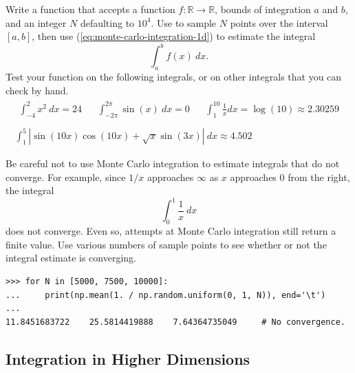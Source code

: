 \begin{problem}
Write a function that accepts a function $f:\mathbb{R}\rightarrow\mathbb{R}$, bounds of integration $a$ and $b$, and an integer $N$ defaulting to $10^4$.
Use  to sample $N$ points over the interval $[a,b]$, then use (\ref{eq:monte-carlo-integration-1d}) to estimate the integral
\[
\int_a^b f(x)\:dx.
\]
Test your function on the following integrals, or on other integrals that you can check by hand.
\[
\begin{array}{c}
    \begin{array}{ccccc}
    \displaystyle\int_{-4}^2 x^2\:dx = 24
    & &
    \displaystyle\int_{-2\pi}^{2\pi} \sin(x)\:dx = 0
    & &
    \displaystyle\int_1^{10} \frac{1}{x}dx = \log(10) \approx 2.30259
    \end{array}
\\ \\
\displaystyle\int_1^5 \left|\sin(10x)\cos(10x) + \sqrt{x}\sin(3x) \right|\:dx \approx 4.502
\end{array}
\]
\label{prob:monte-carlo-integration-1d}
\end{problem}

\begin{warn}
Be careful not to use Monte Carlo integration to estimate integrals that do not converge.
For example, since $1/x$ approaches $\infty$ as $x$ approaches $0$ from the right, the integral \[\int_0^1 \frac{1}{x}\:dx\] does not converge.
Even so, attempts at Monte Carlo integration still return a finite value.
Use various numbers of sample points to see whether or not the integral estimate is converging.
\begin{lstlisting}
>>> for N in [5000, 7500, 10000]:
...     print(np.mean(1. / np.random.uniform(0, 1, N)), end='\t')
...
11.8451683722    25.5814419888    7.64364735049     # No convergence.
\end{lstlisting}
\end{warn}

\subsection*{Integration in Higher Dimensions} %

